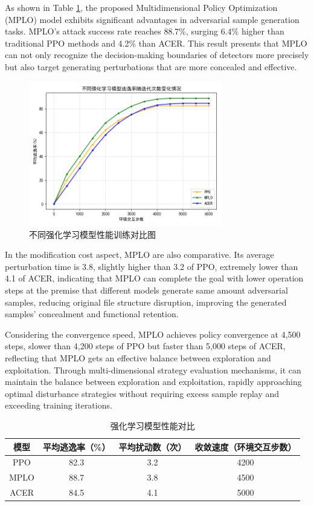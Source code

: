 As shown in Table \ref{tab:5.9}, the proposed Multidimensional Policy Optimization (MPLO) model exhibits significant advantages in adversarial sample generation tasks. MPLO's attack success rate reaches 88.7\%, surging 6.4\% higher than traditional PPO methods and 4.2\% than ACER. This result presents that MPLO can not only recognize the decision-making boundaries of detectors more precisely but also target generating perturbations that are more concealed and effective.
\begin{figure}[hbt]
	\centering
	\includegraphics[width=0.75\textwidth]{figures/5.1}
	\caption{不同强化学习模型性能训练对比图}\label{fig:5.1}
\end{figure}

In the modification cost aspect, MPLO are also comparative. Its average perturbation time is 3.8, slightly higher than 3.2 of PPO, extremely lower than 4.1 of ACER, indicating that MPLO can complete the goal with lower operation steps at the premise that different models generate same amount adversarial samples, reducing original file structure disruption, improving the generated samples' concealment and functional retention.

Considering the convergence speed, MPLO achieves policy convergence at 4,500 steps, slower than 4,200 steps of PPO but faster than 5,000 steps of ACER, reflecting that MPLO gets an effective balance between exploration and exploitation. Through multi-dimensional strategy evaluation mechanisms, it can maintain the balance between exploration and exploitation, rapidly approaching optimal disturbance strategies without requiring excess sample replay and exceeding training iterations.

\begin{table}[htbp]
	\centering
	\caption{强化学习模型性能对比}
	\label{tab:5.9}
	\begin{tabular*}{0.9\textwidth}{@{\extracolsep{\fill}}cccc}
		\toprule
		模型 & 平均逃逸率（\%） & 平均扰动数（次） & 收敛速度（环境交互步数） \\
		\midrule
		PPO & 82.3 & 3.2 & 4200 \\
		MPLO & 88.7 & 3.8 & 4500 \\
		ACER & 84.5 & 4.1 & 5000 \\
		\bottomrule
	\end{tabular*}
\end{table}

